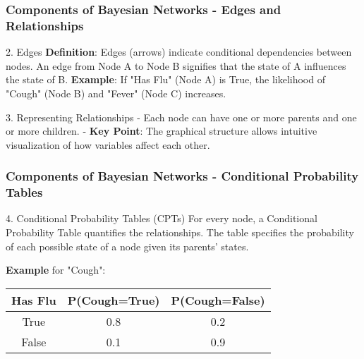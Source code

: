 \documentclass[aspectratio=169]{beamer}
\begin{document}
\begin{frame}[fragile]
    \frametitle{Components of Bayesian Networks - Edges and Relationships}
    \begin{block}{2. Edges}
        \textbf{Definition}: Edges (arrows) indicate conditional dependencies between nodes. An edge from Node A to Node B signifies that the state of A influences the state of B.
        \textbf{Example}: If "Has Flu" (Node A) is True, the likelihood of "Cough" (Node B) and "Fever" (Node C) increases.
    \end{block}
    
    \begin{block}{3. Representing Relationships}
        - Each node can have one or more parents and one or more children.
        - \textbf{Key Point}: The graphical structure allows intuitive visualization of how variables affect each other.
    \end{block}
\end{frame}

\begin{frame}[fragile]
    \frametitle{Components of Bayesian Networks - Conditional Probability Tables}
    \begin{block}{4. Conditional Probability Tables (CPTs)}
        For every node, a Conditional Probability Table quantifies the relationships. The table specifies the probability of each possible state of a node given its parents' states.
        
        \textbf{Example} for "Cough":
        \begin{center}
        \begin{tabular}{|c|c|c|}
        \hline
        Has Flu & P(Cough=True) & P(Cough=False) \\
        \hline
        True & 0.8 & 0.2 \\
        False & 0.1 & 0.9 \\
        \hline
        \end{tabular}
        \end{center}
    \end{block}
\end{frame}
\end{document}

